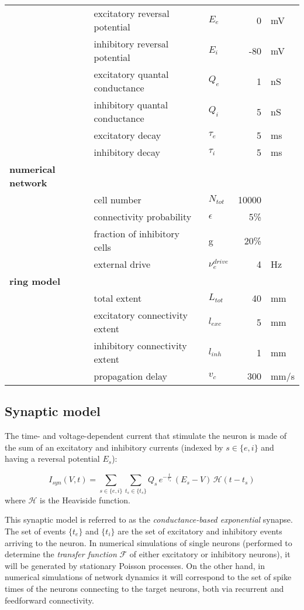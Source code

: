 \documentclass[8pt, colorlinks, a4paper]{article}
\begin{document}
\begin{table*}[tb!]
\begin{tabular}{l|l|l|r|l}
 & excitatory reversal potential & \(E_e\) & 0 & mV\\
 & inhibitory reversal potential & \(E_i\) & -80 & mV\\
 & excitatory quantal conductance & \(Q_e\) & 1 & nS\\
 & inhibitory quantal conductance & \(Q_i\) & 5 & nS\\
 & excitatory decay & \(\tau_e\) & 5 & ms\\
 & inhibitory  decay & \(\tau_i\) & 5 & ms\\
\textbf{numerical network} &  &  &  & \\
 & cell number & \(N_{tot}\) & 10000 & \\
 & connectivity probability & \(\epsilon\) & 5\% & \\
 & fraction of inhibitory cells & g & 20\% & \\
 & external drive & \(\nu_e^{drive}\) & 4 & Hz\\
\textbf{ring model} &  &  &  & \\
 & total extent & \(L_{tot}\) & 40 & mm\\
 & excitatory connectivity extent & \(l_{exc}\) & 5 & mm\\
 & inhibitory connectivity extent & \(l_{inh}\) & 1 & mm\\
 & propagation delay & \(v_c\) & 300 & mm/s\\
\end{tabular}
\end{table*}

\subsection{Synaptic model}
\label{sec-3-2}

The time- and voltage-dependent current that stimulate the neuron is
made of the sum of an excitatory and inhibitory currents (indexed by
\(s \in \{e,i\}\) and having a reversal potential \(E_s\)):

\begin{equation}
\label{eq:syn-current}
 I_{syn}(V,t) = \sum_{s \in \{e,i\}} \sum_{t_s \in \{t_s\}} Q_s \, e^{-\frac{t}{\tau_s}} \, (E_{s}-V) \, \mathcal{H}(t-t_s)
\end{equation}
where \(\mathcal{H}\) is the Heaviside function.

This synaptic model is referred to as the \emph{conductance-based
  exponential} synapse. The set of events \(\{t_e\}\) and \(\{t_i\}\)
are the set of excitatory and inhibitory events arriving to the
neuron. In numerical simulations of single neurons (performed to
determine the \textit{transfer function} \(\mathcal{F}\) of either
excitatory or inhibitory neurons), it will be generated by stationary
Poisson processes. On the other hand, in numerical simulations of
network dynamics it will correspond to the set of spike times of the
neurons connecting to the target neurons, both via recurrent and
feedforward connectivity.
\end{document}
